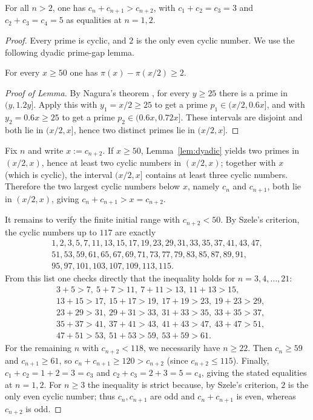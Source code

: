 \begin{theorem}\label{thm:ishikawa}
For all $n>2$, one has $c_n+c_{n+1}>c_{n+2}$, with $c_1+c_2=c_3=3$ and $c_2+c_3=c_4=5$ as equalities at $n=1,2$.
\end{theorem}

\begin{proof}
Every prime is cyclic, and $2$ is the only even cyclic number. We use the following dyadic prime-gap lemma.

\begin{lemma}\label{lem:dyadic}
For every $x\ge 50$ one has $\pi(x)-\pi(x/2)\ge2$.
\end{lemma}

\begin{proof}[Proof of Lemma]
By Nagura's theorem \cite{Nagura1952}, for every $y\ge25$ there is a prime in $(y,1.2y]$. Apply this with $y_1=x/2\ge25$ to get a prime $p_1\in(x/2,0.6x]$, and with $y_2=0.6x\ge25$ to get a prime $p_2\in(0.6x,0.72x]$. These intervals are disjoint and both lie in $(x/2,x]$, hence two distinct primes lie in $(x/2,x]$.
\end{proof}

Fix $n$ and write $x:=c_{n+2}$. If $x\ge50$, Lemma~\ref{lem:dyadic} yields two primes in $(x/2,x)$, hence at least two cyclic numbers in $(x/2,x)$; together with $x$ (which is cyclic), the interval $(x/2,x]$ contains at least three cyclic numbers. Therefore the two largest cyclic numbers below $x$, namely $c_n$ and $c_{n+1}$, both lie in $(x/2,x)$, giving $c_n+c_{n+1}>x=c_{n+2}$.

It remains to verify the finite initial range with $c_{n+2}<50$. By Szele's criterion, the cyclic numbers up to $117$ are exactly
\[
\begin{gathered}
1,2,3,5,7,11,13,15,17,19,23,29,31,33,35,37,41,43,47,\\
51,53,59,61,65,67,69,71,73,77,79,83,85,87,89,91,\\
95,97,101,103,107,109,113,115.
\end{gathered}
\]
From this list one checks directly that the inequality holds for $n=3,4,\dots,21$:
\[
\begin{aligned}
&3+5>7,\ 5+7>11,\ 7+11>13,\ 11+13>15,\\
&13+15>17,\ 15+17>19,\ 17+19>23,\ 19+23>29,\\
&23+29>31,\ 29+31>33,\ 31+33>35,\ 33+35>37,\\
&35+37>41,\ 37+41>43,\ 41+43>47,\ 43+47>51,\\
&47+51>53,\ 51+53>59,\ 53+59>61.
\end{aligned}
\]
For the remaining $n$ with $c_{n+2}<118$, we necessarily have $n\ge22$. Then $c_n\ge59$ and $c_{n+1}\ge61$, so $c_n+c_{n+1}\ge120>c_{n+2}$ (since $c_{n+2}\le115$). Finally, $c_1+c_2=1+2=3=c_3$ and $c_2+c_3=2+3=5=c_4$, giving the stated equalities at $n=1,2$. For $n\ge3$ the inequality is strict because, by Szele's criterion, $2$ is the only even cyclic number; thus $c_n,c_{n+1}$ are odd and $c_n+c_{n+1}$ is even, whereas $c_{n+2}$ is odd.
\end{proof}
